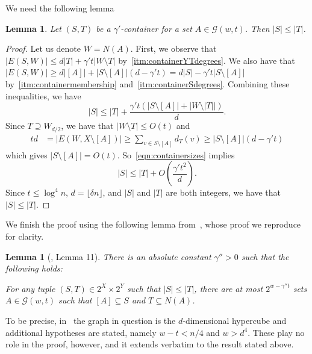 \documentclass[11pt,letterpaper]{amsart}
\newtheorem{lemma}[theorem]{Lemma}
\theoremstyle{definition}
\begin{document}
We need the following lemma
\begin{lemma}
Let $(S,T)$ be a $\gamma'$-container for a set $A \in \mathcal{G}(w,t)$. Then $|S| \leq |T|$.
\end{lemma}

\begin{proof}
Let us denote $W = N(A)$.
First, we observe that $|E(S,W)| \leq d|T| + \gamma' t |W \setminus T|$ by~\ref{itm:containerYTdegrees}. We also have that $|E(S,W)| \geq d|[A]| + |S \setminus [A]|(d - \gamma' t) = d|S| - \gamma' t |S \setminus [A]|$ by~\ref{itm:containermembership} and~\ref{itm:containerSdegrees}. Combining these inequalities, we have
\begin{equation}\label{eqn:containersizes}
|S| \leq |T| + \frac{\gamma' t(|S \setminus [A]| + |W \setminus |T||)}{d}.
\end{equation}
Since $T \supseteq W_{d/2}$, we have that $|W \setminus T| \leq O(t)$ and
\begin{align*}
td & = |E(W,X\setminus [A])| \geq \sum_{v \in S \setminus [A]}d_{T}(v) \geq |S \setminus [A]|(d - \gamma' t)
\end{align*}
which gives $|S \setminus [A]| = O(t)$. So~\eqref{eqn:containersizes} implies
\[
|S| \leq |T| + O\left(\frac{\gamma' t^2}{d}\right).
\]
Since $t \leq \log^4 n$, $d=\lfloor\delta n\rfloor$, and $|S|$ and $|T|$ are both integers, we have that $|S| \leq |T|$.
\end{proof}

We finish the proof using the following lemma from~\cite{PARK22}, whose proof we reproduce for clarity.

\begin{lemma}[\cite{PARK22}, Lemma 11]\label{lem:PARK}
There is an absolute constant $\gamma''>0$ such that the following holds:

For any tuple $(S,T)\in 2^X \times 2^Y$ such that $|S| \leq |T|$, there are at most $2^{w - \gamma'' t}$ sets $A \in \mathcal{G}(w,t)$ such that $[A] \subseteq S$ and $T \subseteq N(A)$.
\end{lemma}

To be precise, in~\cite{PARK22} the graph in question is the $d$-dimensional hypercube and additional hypotheses are stated, namely $w-t < n/4$ and $w > d^4$. These play no role in the proof, however, and it extends verbatim to the result stated above. 
\end{document}
